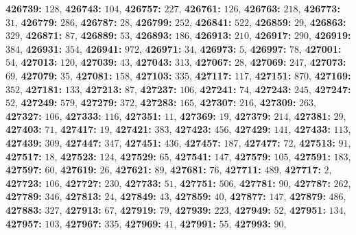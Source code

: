 \textsf{\bfseries 426739:} $128$, \textsf{\bfseries 426743:} $104$, \textsf{\bfseries 426757:} $227$, \textsf{\bfseries 426761:} $126$, \textsf{\bfseries 426763:} $218$, \textsf{\bfseries 426773:} $31$, \textsf{\bfseries 426779:} $286$, \textsf{\bfseries 426787:} $28$, \textsf{\bfseries 426799:} $252$, \textsf{\bfseries 426841:} $522$, \textsf{\bfseries 426859:} $29$, \textsf{\bfseries 426863:} $329$, \textsf{\bfseries 426871:} $87$, \textsf{\bfseries 426889:} $53$, \textsf{\bfseries 426893:} $186$, \textsf{\bfseries 426913:} $210$, \textsf{\bfseries 426917:} $290$, \textsf{\bfseries 426919:} $384$, \textsf{\bfseries 426931:} $354$, \textsf{\bfseries 426941:} $972$, \textsf{\bfseries 426971:} $34$, \textsf{\bfseries 426973:} $5$, \textsf{\bfseries 426997:} $78$, \textsf{\bfseries 427001:} $54$, \textsf{\bfseries 427013:} $120$, \textsf{\bfseries 427039:} $43$, \textsf{\bfseries 427043:} $313$, \textsf{\bfseries 427067:} $28$, \textsf{\bfseries 427069:} $247$, \textsf{\bfseries 427073:} $69$, \textsf{\bfseries 427079:} $35$, \textsf{\bfseries 427081:} $158$, \textsf{\bfseries 427103:} $335$, \textsf{\bfseries 427117:} $117$, \textsf{\bfseries 427151:} $870$, \textsf{\bfseries 427169:} $352$, \textsf{\bfseries 427181:} $133$, \textsf{\bfseries 427213:} $87$, \textsf{\bfseries 427237:} $106$, \textsf{\bfseries 427241:} $74$, \textsf{\bfseries 427243:} $245$, \textsf{\bfseries 427247:} $52$, \textsf{\bfseries 427249:} $579$, \textsf{\bfseries 427279:} $372$, \textsf{\bfseries 427283:} $165$, \textsf{\bfseries 427307:} $216$, \textsf{\bfseries 427309:} $263$, \textsf{\bfseries 427327:} $106$, \textsf{\bfseries 427333:} $116$, \textsf{\bfseries 427351:} $11$, \textsf{\bfseries 427369:} $19$, \textsf{\bfseries 427379:} $214$, \textsf{\bfseries 427381:} $29$, \textsf{\bfseries 427403:} $71$, \textsf{\bfseries 427417:} $19$, \textsf{\bfseries 427421:} $383$, \textsf{\bfseries 427423:} $456$, \textsf{\bfseries 427429:} $141$, \textsf{\bfseries 427433:} $113$, \textsf{\bfseries 427439:} $309$, \textsf{\bfseries 427447:} $347$, \textsf{\bfseries 427451:} $436$, \textsf{\bfseries 427457:} $187$, \textsf{\bfseries 427477:} $72$, \textsf{\bfseries 427513:} $91$, \textsf{\bfseries 427517:} $18$, \textsf{\bfseries 427523:} $124$, \textsf{\bfseries 427529:} $65$, \textsf{\bfseries 427541:} $147$, \textsf{\bfseries 427579:} $105$, \textsf{\bfseries 427591:} $183$, \textsf{\bfseries 427597:} $60$, \textsf{\bfseries 427619:} $26$, \textsf{\bfseries 427621:} $89$, \textsf{\bfseries 427681:} $76$, \textsf{\bfseries 427711:} $489$, \textsf{\bfseries 427717:} $2$, \textsf{\bfseries 427723:} $106$, \textsf{\bfseries 427727:} $230$, \textsf{\bfseries 427733:} $51$, \textsf{\bfseries 427751:} $506$, \textsf{\bfseries 427781:} $90$, \textsf{\bfseries 427787:} $262$, \textsf{\bfseries 427789:} $346$, \textsf{\bfseries 427813:} $24$, \textsf{\bfseries 427849:} $43$, \textsf{\bfseries 427859:} $40$, \textsf{\bfseries 427877:} $147$, \textsf{\bfseries 427879:} $486$, \textsf{\bfseries 427883:} $327$, \textsf{\bfseries 427913:} $67$, \textsf{\bfseries 427919:} $79$, \textsf{\bfseries 427939:} $223$, \textsf{\bfseries 427949:} $52$, \textsf{\bfseries 427951:} $134$, \textsf{\bfseries 427957:} $103$, \textsf{\bfseries 427967:} $335$, \textsf{\bfseries 427969:} $41$, \textsf{\bfseries 427991:} $55$, \textsf{\bfseries 427993:} $90$, 
